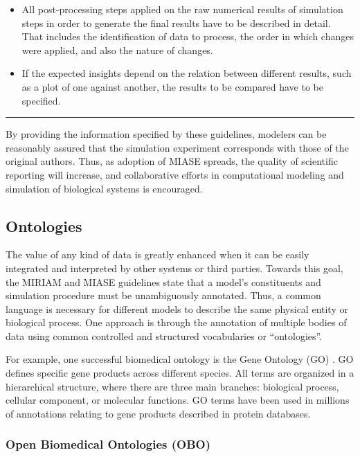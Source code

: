 \begin{itemize}
\item
  All post-processing steps applied on the raw numerical results of
  simulation steps in order to generate the final results have to be
  described in detail. That includes the identification of data to
  process, the order in which changes were applied, and also the nature
  of changes.
\item
  If the expected insights depend on the relation between different
  results, such as a plot of one against another, the results to be
  compared have to be specified.
\end{itemize}
\begin{center}\rule{3in}{0.4pt}\end{center}

By providing the information specified by these guidelines, modelers can
be reasonably assured that the simulation experiment corresponds with
those of the original authors. Thus, as adoption of MIASE spreads, the
quality of scientific reporting will increase, and collaborative efforts
in computational modeling and simulation of biological systems is
encouraged.

\subsection{Ontologies}

The value of any kind of data is greatly enhanced when it can be easily
integrated and interpreted by other systems or third parties. Towards
this goal, the MIRIAM and MIASE guidelines state that a model's
constituents and simulation procedure must be unambiguously annotated.
Thus, a common language is necessary for different models to describe
the same physical entity or biological process. One approach is through
the annotation of multiple bodies of data using common controlled and
structured vocabularies or ``ontologies''.

For example, one successful biomedical ontology is the Gene Ontology
(GO) \autocite{smith2005relations}. GO defines specific gene products
across different species. All terms are organized in a hierarchical
structure, where there are three main branches: biological process,
cellular component, or molecular functions. GO terms have been used in
millions of annotations relating to gene products described in protein
databases.

\subsubsection{Open Biomedical Ontologies (OBO)}

